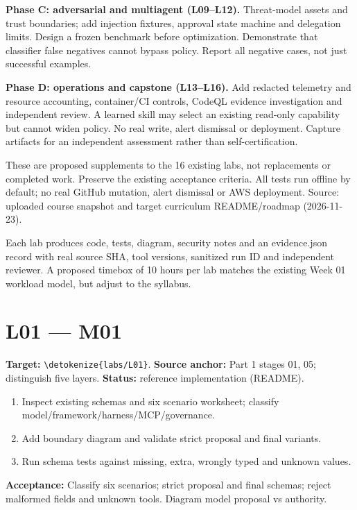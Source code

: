 \documentclass[11pt,letterpaper]{article}
\newcommand{\src}[1]{\expandafter\nolinkurl\expandafter{\detokenize{#1}}}
\begin{document}
\textbf{Phase C: adversarial and multiagent (L09--L12).} Threat-model assets and trust boundaries; add injection fixtures, approval state machine and delegation limits. Design a frozen benchmark before optimization. Demonstrate that classifier false negatives cannot bypass policy. Report all negative cases, not just successful examples.

\textbf{Phase D: operations and capstone (L13--L16).} Add redacted telemetry and resource accounting, container/CI controls, CodeQL evidence investigation and independent review. A learned skill may select an existing read-only capability but cannot widen policy. No real write, alert dismissal or deployment. Capture artifacts for an independent assessment rather than self-certification.

These are proposed supplements to the 16 existing labs, not replacements or completed work. Preserve the existing acceptance criteria. All tests run offline by default; no real GitHub mutation, alert dismissal or AWS deployment. Source: uploaded course snapshot and target curriculum README/roadmap (2026-11-23).

Each lab produces code, tests, diagram, security notes and an evidence.json record with real source SHA, tool versions, sanitized run ID and independent reviewer. A proposed timebox of 10 hours per lab matches the existing Week 01 workload model, but adjust to the syllabus.

\section{L01 --- M01}

\textbf{Target:} \src{labs/L01}. \textbf{Source anchor:} Part 1 stages 01, 05; distinguish five layers. \textbf{Status:} reference implementation (README).

\begin{enumerate}
\item Inspect existing schemas and six scenario worksheet; classify model/framework/harness/MCP/governance.
\item Add boundary diagram and validate strict proposal and final variants.
\item Run schema tests against missing, extra, wrongly typed and unknown values.
\end{enumerate}

\textbf{Acceptance:} Classify six scenarios; strict proposal and final schemas; reject malformed fields and unknown tools. Diagram model proposal vs authority.
\end{document}

